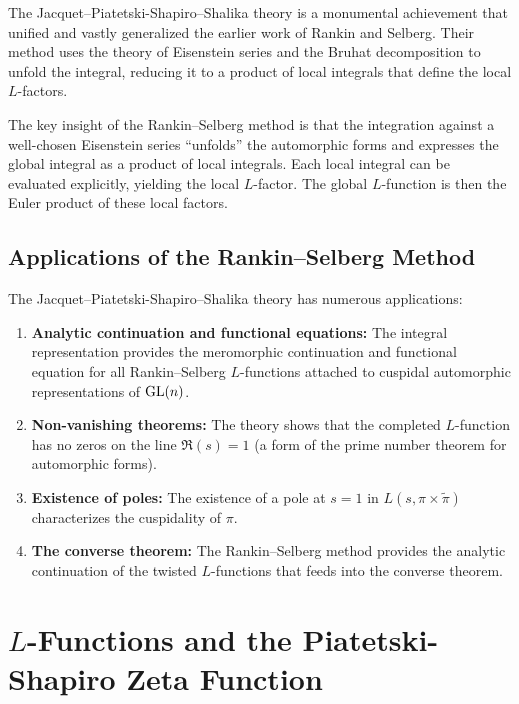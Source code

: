 The Jacquet--Piatetski-Shapiro--Shalika theory is a monumental achievement that unified and vastly generalized the earlier work of Rankin and Selberg. Their method uses the theory of Eisenstein series and the Bruhat decomposition to unfold the integral, reducing it to a product of local integrals that define the local \(L\)-factors.

The key insight of the Rankin--Selberg method is that the integration against a well-chosen Eisenstein series ``unfolds'' the automorphic forms and expresses the global integral as a product of local integrals. Each local integral can be evaluated explicitly, yielding the local \(L\)-factor. The global \(L\)-function is then the Euler product of these local factors.

\subsection{Applications of the Rankin--Selberg Method}

The Jacquet--Piatetski-Shapiro--Shalika theory has numerous applications:

\begin{enumerate}
    \item \textbf{Analytic continuation and functional equations:} The integral representation provides the meromorphic continuation and functional equation for all Rankin--Selberg \(L\)-functions attached to cuspidal automorphic representations of \(\operatorname{GL}(n)\).

    \item \textbf{Non-vanishing theorems:} The theory shows that the completed \(L\)-function has no zeros on the line \(\Re(s) = 1\) (a form of the prime number theorem for automorphic forms).

    \item \textbf{Existence of poles:} The existence of a pole at \(s = 1\) in \(L(s, \pi \times \widetilde{\pi})\) characterizes the cuspidality of \(\pi\).

    \item \textbf{The converse theorem:} The Rankin--Selberg method provides the analytic continuation of the twisted \(L\)-functions that feeds into the converse theorem.
\end{enumerate}

\section{\texorpdfstring{\(L\)}{L}-Functions and the Piatetski-Shapiro Zeta Function}

